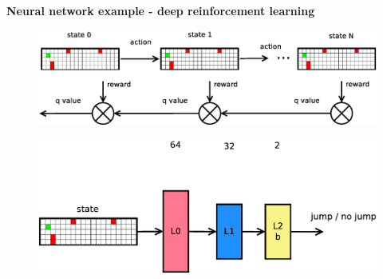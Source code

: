 \documentclass[xcolor=dvipsnames]{beamer}
\begin{document}
\begin{frame}{\bf Neural network example - deep reinforcement learning}

\begin{figure}[htbp]
  \centering
  \includegraphics[scale=0.3]{../../diagrams/rl_nn_learn.png}
\end{figure}


\begin{figure}[htbp]
  \centering
  \includegraphics[scale=0.3]{../../diagrams/fnn.png}
\end{figure}

\end{frame}
\end{document}
